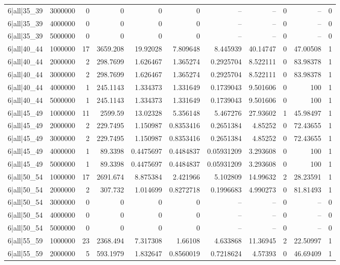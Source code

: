 \begin{tabular}{lrrrrrrrrrr}
6|all|35\_39 & 3000000 & 0 & 0 & 0 & 0 & -- & -- & 0 & -- & 0 \\
6|all|35\_39 & 4000000 & 0 & 0 & 0 & 0 & -- & -- & 0 & -- & 0 \\
6|all|35\_39 & 5000000 & 0 & 0 & 0 & 0 & -- & -- & 0 & -- & 0 \\
6|all|40\_44 & 1000000 & 17 & 3659.208 & 19.92028 & 7.809648 & 8.445939 & 40.14747 & 0 & 47.00508 & 1 \\
6|all|40\_44 & 2000000 & 2 & 298.7699 & 1.626467 & 1.365274 & 0.2925704 & 8.522111 & 0 & 83.98378 & 1 \\
6|all|40\_44 & 3000000 & 2 & 298.7699 & 1.626467 & 1.365274 & 0.2925704 & 8.522111 & 0 & 83.98378 & 1 \\
6|all|40\_44 & 4000000 & 1 & 245.1143 & 1.334373 & 1.331649 & 0.1739043 & 9.501606 & 0 & 100 & 1 \\
6|all|40\_44 & 5000000 & 1 & 245.1143 & 1.334373 & 1.331649 & 0.1739043 & 9.501606 & 0 & 100 & 1 \\
6|all|45\_49 & 1000000 & 11 & 2599.59 & 13.02328 & 5.356148 & 5.467276 & 27.93602 & 1 & 45.98497 & 1 \\
6|all|45\_49 & 2000000 & 2 & 229.7495 & 1.150987 & 0.8353416 & 0.2651384 & 4.85252 & 0 & 72.43655 & 1 \\
6|all|45\_49 & 3000000 & 2 & 229.7495 & 1.150987 & 0.8353416 & 0.2651384 & 4.85252 & 0 & 72.43655 & 1 \\
6|all|45\_49 & 4000000 & 1 & 89.3398 & 0.4475697 & 0.4484837 & 0.05931209 & 3.293608 & 0 & 100 & 1 \\
6|all|45\_49 & 5000000 & 1 & 89.3398 & 0.4475697 & 0.4484837 & 0.05931209 & 3.293608 & 0 & 100 & 1 \\
6|all|50\_54 & 1000000 & 17 & 2691.674 & 8.875384 & 2.421966 & 5.102809 & 14.99632 & 2 & 28.23591 & 1 \\
6|all|50\_54 & 2000000 & 2 & 307.732 & 1.014699 & 0.8272718 & 0.1996683 & 4.990273 & 0 & 81.81493 & 1 \\
6|all|50\_54 & 3000000 & 0 & 0 & 0 & 0 & -- & -- & 0 & -- & 0 \\
6|all|50\_54 & 4000000 & 0 & 0 & 0 & 0 & -- & -- & 0 & -- & 0 \\
6|all|50\_54 & 5000000 & 0 & 0 & 0 & 0 & -- & -- & 0 & -- & 0 \\
6|all|55\_59 & 1000000 & 23 & 2368.494 & 7.317308 & 1.66108 & 4.633868 & 11.36945 & 2 & 22.50997 & 1 \\
6|all|55\_59 & 2000000 & 5 & 593.1979 & 1.832647 & 0.8560019 & 0.7218624 & 4.57393 & 0 & 46.69409 & 1 \\

\end{tabular}

